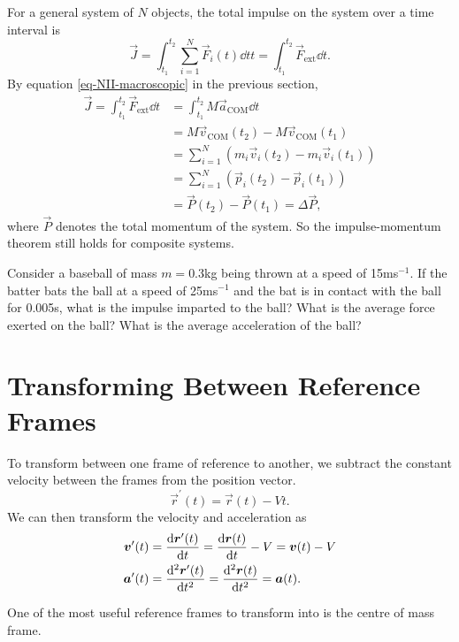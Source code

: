 \documentclass[../classical_mechanics.tex]{subfiles}
\begin{document}
        For a general system of $N$ objects, the total impulse on the system over a time interval is
        \begin{equation}
            \vec{J}=\int_{t_1}^{t_2}\sum_{i=1}^N\vec{F}_i(t)\dd{t}t=\int_{t_1}^{t_2}\vec{F}_\text{ext}\dd{t}.
        \end{equation}
        By equation \ref{eq-NII-macroscopic} in the previous section,
        \begin{align}
            \vec{J}=\int_{t_1}^{t_2}\vec{F}_\text{ext}\dd{t}&=\int_{t_1}^{t_2}M\vec{a}_\text{COM}\dd{t}\\
            &=M\vec{v}_\text{COM}(t_2)-M\vec{v}_\text{COM}(t_1)\\
            &=\sum_{i=1}^N\left(m_i\vec{v}_i(t_2)-m_i\vec{v}_i(t_1)\right)\\
            &=\sum_{i=1}^N\left(\vec{p}_i(t_2)-\vec{p}_i(t_1)\right)\\
            &=\vec{P}(t_2)-\vec{P}(t_1)=\Delta\vec{P},
        \end{align}
        where $\vec{P}$ denotes the total momentum of the system.
        So the impulse-momentum theorem still holds for composite systems.
        \begin{example}
            Consider a baseball of mass $m=$0.3kg being thrown at a speed of 15ms$^{-1}$.
            If the batter bats the ball at a speed of 25ms$^{-1}$ and the bat is in contact with the ball for 0.005s, what is the impulse imparted to the ball?
            What is the average force exerted on the ball? What is the average acceleration of the ball?
        \end{example}

    \section{Transforming Between Reference Frames}\label{transforming-between-reference-frames}
        To transform between one frame of reference to another, we subtract the constant velocity between the frames from the position vector.
        \begin{equation}
            \vec{r}^\prime(t)=\vec{r}(t)-Vt.
        \end{equation}
        We can then transform the velocity and acceleration as
        \begin{align}
            \vec{v}^\prime(t)&=\dv{\vec{r}^\prime(t)}{t}=\dv{\vec{r}(t)}{t}-V=\vec{v}(t)-V\\
            \vec{a}^\prime(t)&=\dv[2]{\vec{r}^\prime(t)}{t}=\dv[2]{\vec{r}(t)}{t}=\vec{a}(t).
        \end{align}

        One of the most useful reference frames to transform into is the centre of mass frame.
\end{document}

